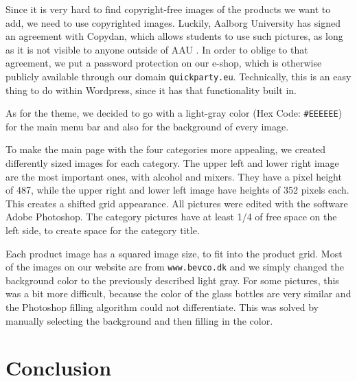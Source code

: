 \documentclass[12p]{article}
\begin{document}
Since it is very hard to find copyright-free images of the products we want to add, we need to use copyrighted images. Luckily, Aalborg University has signed an agreement with Copydan, which allows students to use such pictures, as long as it is not visible to anyone outside of AAU \cite{AAUCopyrightAgreement}. In order to oblige to that agreement, we put a password protection on our e-shop, which is otherwise publicly available through our domain \texttt{quickparty.eu}. Technically, this is an easy thing to do within Wordpress, since it has that functionality built in.

As for the theme, we decided to go with a light-gray color (Hex Code: \texttt{\#EEEEEE}) for the main menu bar and also for the background of every image. 

To make the main page with the four categories more appealing, we created differently sized images for each category. The upper left and lower right image are the most important ones, with alcohol and mixers. They have a pixel height of 487, while the upper right and lower left image have heights of 352 pixels each. This creates a shifted grid appearance. All pictures were edited with the software Adobe Photoshop. The category pictures have at least 1/4 of free space on the left side, to create space for the category title.

Each product image has a squared image size, to fit into the product grid. Most of the images on our website are from \texttt{www.bevco.dk} and we simply changed the background color to the previously described light gray. For some pictures, this was a bit more difficult, because the color of the glass bottles are very similar and the Photoshop filling algorithm could  not differentiate. This was solved by manually selecting the background and then filling in the color.


\newpage
\section{Conclusion}


\newpage
\printbibliography[heading=bibintoc,title={References}]

\end{document}
